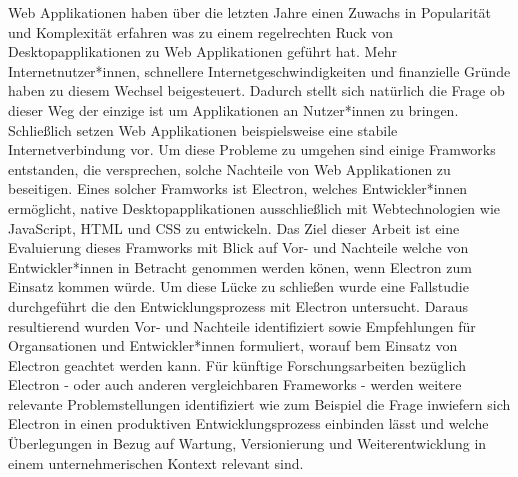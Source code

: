 Web Applikationen haben über die letzten Jahre einen Zuwachs 
in Popularität und Komplexität erfahren was zu einem regelrechten
Ruck von Desktopapplikationen zu Web Applikationen geführt hat. 
Mehr Internetnutzer*innen, schnellere Internetgeschwindigkeiten 
und finanzielle Gründe haben zu diesem Wechsel beigesteuert. 
Dadurch stellt sich natürlich die Frage ob dieser Weg der 
einzige ist um Applikationen an Nutzer*innen zu bringen. 
Schließlich setzen Web Applikationen beispielsweise eine stabile 
Internetverbindung vor.
Um diese Probleme zu umgehen sind einige Framworks entstanden, die
versprechen, solche Nachteile von Web Applikationen zu beseitigen. 
Eines solcher Framworks ist Electron, welches Entwickler*innen
ermöglicht, native Desktopapplikationen ausschließlich mit 
Webtechnologien wie JavaScript, HTML und CSS zu entwickeln.
Das Ziel dieser Arbeit ist eine Evaluierung dieses Framworks
mit Blick auf Vor- und Nachteile welche von Entwickler*innen
in Betracht genommen werden könen, wenn Electron zum Einsatz kommen würde. 
Um diese Lücke zu schließen wurde eine Fallstudie durchgeführt 
die den Entwicklungsprozess mit Electron untersucht.
Daraus resultierend wurden Vor- und Nachteile identifiziert 
sowie Empfehlungen für Organsationen und Entwickler*innen formuliert, 
worauf bem Einsatz von Electron geachtet werden kann. 
Für künftige Forschungsarbeiten bezüglich Electron - oder auch anderen
vergleichbaren Frameworks - werden weitere relevante Problemstellungen
identifiziert wie zum Beispiel die Frage inwiefern sich Electron in 
einen produktiven Entwicklungsprozess einbinden lässt und welche 
Überlegungen in Bezug auf Wartung, Versionierung und Weiterentwicklung
in einem unternehmerischen Kontext relevant sind.